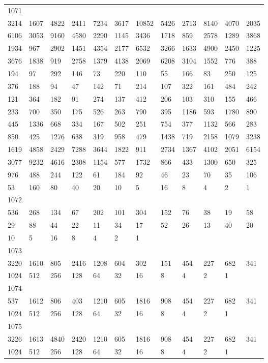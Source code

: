 \begin{longtable}{llllllllllll}
1071&&&&&&&&&&&\\
3214& 1607& 4822& 2411& 7234& 3617& 10852& 5426& 2713& 8140& 4070& 2035\\
6106& 3053& 9160& 4580& 2290& 1145& 3436& 1718& 859& 2578& 1289& 3868\\
1934& 967& 2902& 1451& 4354& 2177& 6532& 3266& 1633& 4900& 2450& 1225\\
3676& 1838& 919& 2758& 1379& 4138& 2069& 6208& 3104& 1552& 776& 388\\
194& 97& 292& 146& 73& 220& 110& 55& 166& 83& 250& 125\\
376& 188& 94& 47& 142& 71& 214& 107& 322& 161& 484& 242\\
121& 364& 182& 91& 274& 137& 412& 206& 103& 310& 155& 466\\
233& 700& 350& 175& 526& 263& 790& 395& 1186& 593& 1780& 890\\
445& 1336& 668& 334& 167& 502& 251& 754& 377& 1132& 566& 283\\
850& 425& 1276& 638& 319& 958& 479& 1438& 719& 2158& 1079& 3238\\
1619& 4858& 2429& 7288& 3644& 1822& 911& 2734& 1367& 4102& 2051& 6154\\
3077& 9232& 4616& 2308& 1154& 577& 1732& 866& 433& 1300& 650& 325\\
976& 488& 244& 122& 61& 184& 92& 46& 23& 70& 35& 106\\
53& 160& 80& 40& 20& 10& 5& 16& 8& 4& 2& 1\\

1072&&&&&&&&&&&\\
536& 268& 134& 67& 202& 101& 304& 152& 76& 38& 19& 58\\
29& 88& 44& 22& 11& 34& 17& 52& 26& 13& 40& 20\\
10& 5& 16& 8& 4& 2& 1& \\

1073&&&&&&&&&&&\\
3220& 1610& 805& 2416& 1208& 604& 302& 151& 454& 227& 682& 341\\
1024& 512& 256& 128& 64& 32& 16& 8& 4& 2& 1& \\

1074&&&&&&&&&&&\\
537& 1612& 806& 403& 1210& 605& 1816& 908& 454& 227& 682& 341\\
1024& 512& 256& 128& 64& 32& 16& 8& 4& 2& 1& \\

1075&&&&&&&&&&&\\
3226& 1613& 4840& 2420& 1210& 605& 1816& 908& 454& 227& 682& 341\\
1024& 512& 256& 128& 64& 32& 16& 8& 4& 2& 1& \\


\end{longtable}
